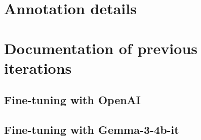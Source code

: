 \documentclass[11pt]{article}
\begin{document}
\section{Annotation details} \label{app:annotation}

\subsection{}

\section{Documentation of previous iterations}
\subsection{Fine-tuning with OpenAI}

\subsection{Fine-tuning with Gemma-3-4b-it}
\end{document}

